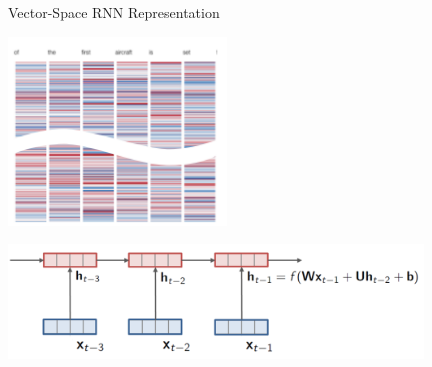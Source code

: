 \documentclass{beamer}
\newcommand{\air}{\vspace{0.25cm}}
\newcommand{\Cite}[1]{{\footnotesize \citep{#1}}}
\begin{document}






\begin{frame}
  \centerline{Vector-Space RNN Representation}
  \begin{center}
    \includegraphics[height=5cm]{lstmrep}
  \begin{center}
    \includegraphics[width=11cm]{rnn}
  \end{center}
  \end{center}
\end{frame}
\end{document}

